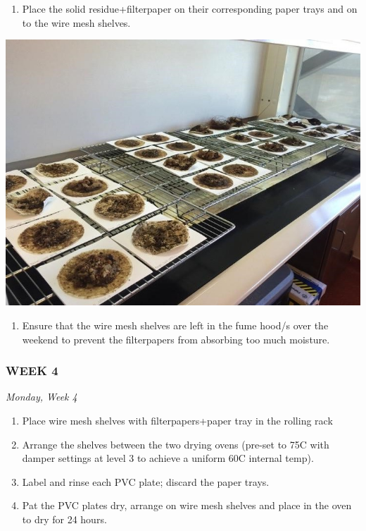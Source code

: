 \documentclass[
]{book}
\providecommand{\tightlist}{%
  \setlength{\itemsep}{0pt}\setlength{\parskip}{0pt}}
\begin{document}
\begin{enumerate}
\def\labelenumi{\arabic{enumi}.}
\setcounter{enumi}{6}
\tightlist
\item
  Place the solid residue+filterpaper on their corresponding paper trays and on to the wire mesh shelves.
\end{enumerate}

\includegraphics{images/DailyTasks14.jpg}

\begin{enumerate}
\def\labelenumi{\arabic{enumi}.}
\setcounter{enumi}{7}
\tightlist
\item
  Ensure that the wire mesh shelves are left in the fume hood/s over the weekend to prevent the filterpapers from absorbing too much moisture.
\end{enumerate}

\hypertarget{week-4}{%
\subsubsection{WEEK 4}\label{week-4}}

\emph{Monday, Week 4}

\begin{enumerate}
\def\labelenumi{\arabic{enumi}.}
\tightlist
\item
  Place wire mesh shelves with filterpapers+paper tray in the rolling rack
\item
  Arrange the shelves between the two drying ovens (pre-set to 75C with damper settings at level 3 to achieve a uniform 60C internal temp).
\item
  Label and rinse each PVC plate; discard the paper trays.
\item
  Pat the PVC plates dry, arrange on wire mesh shelves and place in the oven to dry for 24 hours.
\end{enumerate}
\end{document}
